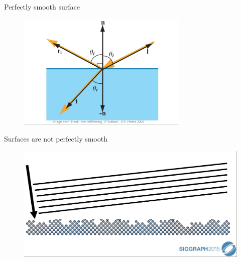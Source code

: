 \documentclass[]{beamer}
\begin{document}

\begin{frame}


    \textcolor{mypink1}{Perfectly smooth surface }
   

    
    \begin{figure}[h!]
      \begin{center}
        \includegraphics[height=2.2in]{images/11.jpg}
      \end{center}
    \end{figure}
  \end{frame}
    


\begin{frame}


    \textcolor{mypink1}{Surfaces are not perfectly smooth }
   

    
    \begin{figure}[h!]
      \begin{center}
        \includegraphics[height=2.2in]{images/7.jpg}
      \end{center}
    \end{figure}
  \end{frame}
    
\end{document}
